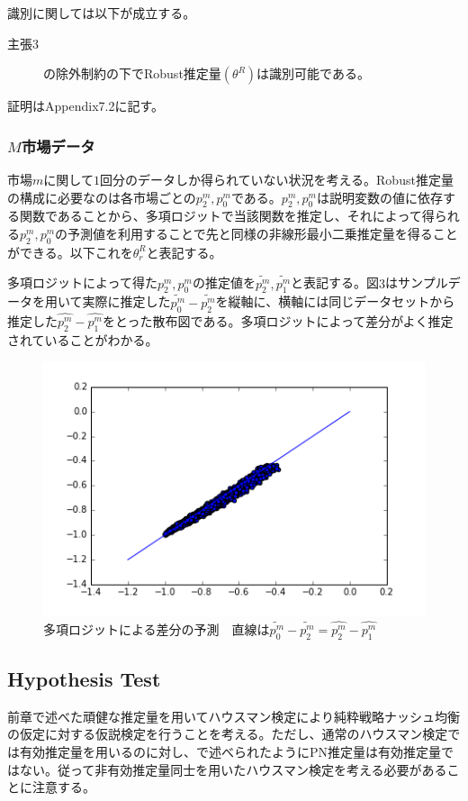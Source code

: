 \documentclass{jsarticle}
\begin{document}
識別に関しては以下が成立する。
\begin{description}
	\item[主張3] \cite{Tamer2003a}の除外制約の下でRobust推定量$(\theta^R)$は識別可能である。
\end{description}
証明はAppendix7.2に記す。

\subsubsection{$M$市場データ}
市場$m$に関して$1$回分のデータしか得られていない状況を考える。Robust推定量の構成に必要なのは各市場ごとの$p_2^m,p_0^m$である。$p_2^m,p_0^m$は説明変数の値に依存する関数であることから、多項ロジットで当該関数を推定し、それによって得られる$p_2^m,p_0^m$の予測値を利用することで先と同様の非線形最小二乗推定量を得ることができる。以下これを$\theta_r^R$と表記する。

多項ロジットによって得た$p_2^m,p_0^m$の推定値を$\tilde{p_2^m}, \tilde{p_1^m}$と表記する。図$3$はサンプルデータを用いて実際に推定した$\tilde{p_0^m} - \tilde{p_2^m}$を縦軸に、横軸には同じデータセットから推定した$\hat{p_2^m} - \hat{p_1^m}$をとった散布図である。多項ロジットによって差分がよく推定されていることがわかる。

\begin{figure}[t]
\centering
\includegraphics{logit.png}
\caption{多項ロジットによる差分の予測　直線は$\tilde{p_0^m} - \tilde{p_2^m} = \hat{p_2^m} - \hat{p_1^m}$}
\end{figure}

\subsection{Hypothesis Test}
前章で述べた頑健な推定量を用いてハウスマン検定により純粋戦略ナッシュ均衡の仮定に対する仮説検定を行うことを考える。ただし、通常のハウスマン検定では有効推定量を用いるのに対し、\cite{Tamer2003a}で述べられたようにPN推定量は有効推定量ではない。従って非有効推定量同士を用いたハウスマン検定を考える必要があることに注意する。
\end{document}
